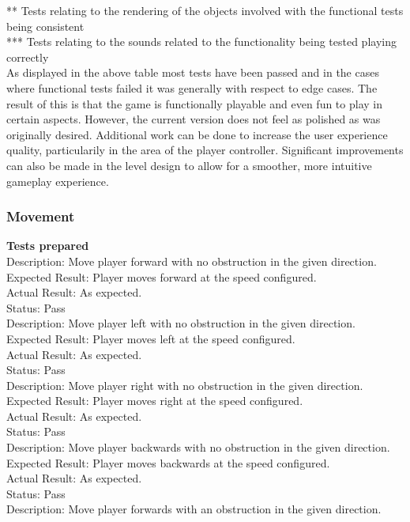 \documentclass[11pt,a4paper]{article}
\begin{document}
** Tests relating to the rendering of the objects involved with the functional tests being consistent\\
*** Tests relating to the sounds related to the functionality being tested playing correctly\\
As displayed in the above table most tests have been passed and in the cases where functional tests failed it was generally with respect to edge cases. The result of this is that the game is functionally playable and even fun to play in certain aspects. However, the current version does not feel as polished as was originally desired. Additional work can be done to increase the user experience quality, particularily in the area of the player controller. Significant improvements can also be made in the level design to allow for a smoother, more intuitive gameplay experience.
\subsubsection{Movement}
\textbf{Tests prepared}\\
Description: Move player forward with no obstruction in the given direction.\\
Expected Result: Player moves forward at the speed configured.\\
Actual Result: As expected.\\
Status: Pass
\smallskip\\
Description: Move player left with no obstruction in the given direction.\\
Expected Result: Player moves left at the speed configured.\\
Actual Result: As expected.\\
Status: Pass
\smallskip\\
Description: Move player right with no obstruction in the given direction.\\
Expected Result: Player moves right at the speed configured.\\
Actual Result: As expected.\\
Status: Pass
\smallskip\\
Description: Move player backwards with no obstruction in the given direction.\\
Expected Result: Player moves backwards at the speed configured.\\
Actual Result: As expected.\\
Status: Pass
\smallskip\\
Description: Move player forwards with an obstruction in the given direction.\\
\end{document}
